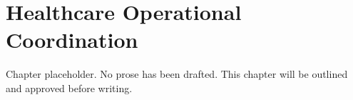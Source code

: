 \chapter{Healthcare Operational Coordination}
\begin{notebox}
Chapter placeholder. No prose has been drafted. This chapter will be outlined and approved before writing.
\end{notebox}
